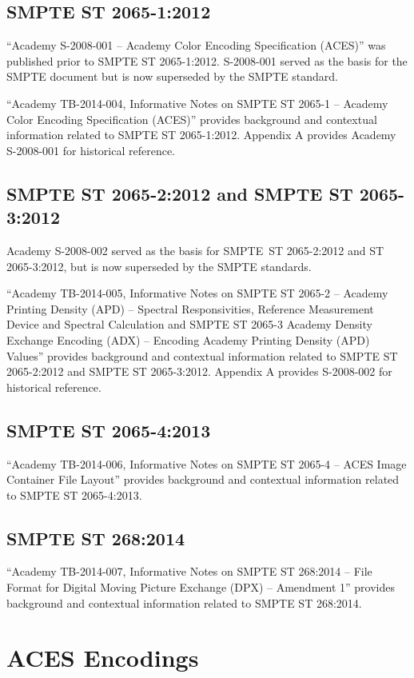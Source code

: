 \subsection{SMPTE ST 2065-1:2012}
\label{aces}
``Academy S-2008-001 -- Academy Color Encoding Specification (ACES)'' was published prior to SMPTE ST 2065-1:2012. S-2008-001 served as the basis for the SMPTE document but is now superseded by the SMPTE standard.

``Academy TB-2014-004, Informative Notes on SMPTE ST 2065-1 -- Academy Color Encoding Specification (ACES)'' provides background and contextual information related to SMPTE ST 2065-1:2012. Appendix A provides Academy S-2008-001 for historical reference.

\subsection{SMPTE ST 2065-2:2012 and SMPTE ST 2065-3:2012}
Academy S-2008-002 served as the basis for SMPTE ST 2065-2:2012 and ST 2065-3:2012, but is now superseded by the SMPTE standards.

``Academy TB-2014-005, Informative Notes on SMPTE ST 2065-2 -- Academy Printing Density (APD) -- Spectral Responsivities, Reference Measurement Device and Spectral Calculation and SMPTE ST 2065-3 Academy Density Exchange Encoding (ADX) -- Encoding Academy Printing Density (APD) Values'' provides background and contextual information related to SMPTE ST 2065-2:2012 and SMPTE ST 2065-3:2012. Appendix A provides S-2008-002 for historical reference.

\subsection{SMPTE ST 2065-4:2013}
\label{acescontainer}
``Academy TB-2014-006, Informative Notes on SMPTE ST 2065-4 -- ACES Image Container File Layout'' provides background and contextual information related to SMPTE ST 2065-4:2013.

\subsection{SMPTE ST 268:2014}
\label{adxcontainer}
``Academy TB-2014-007, Informative Notes on SMPTE ST 268:2014 -- File Format for Digital Moving Picture Exchange (DPX) -- Amendment 1'' provides background and contextual information related to SMPTE ST 268:2014.


\section{ACES Encodings}
